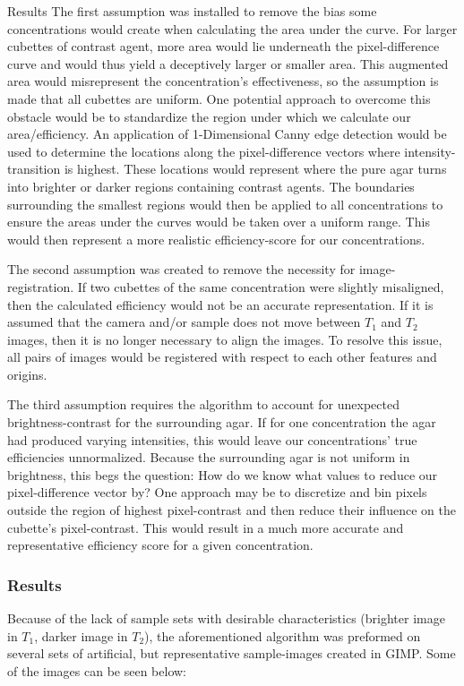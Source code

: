 \documentclass[a4paper,12pt]{article}
\begin{document}
\begin{section}{Results}
The first assumption was installed to remove the bias some concentrations would create when calculating the area under the curve. For larger cubettes of contrast agent, more area would lie underneath the pixel-difference curve and would thus yield a deceptively larger or smaller area. This augmented area would misrepresent the concentration's effectiveness, so the assumption is made that all cubettes are uniform. One potential approach to overcome this obstacle would be to standardize the region under which we calculate our area/efficiency. An application of 1-Dimensional Canny edge detection would be used to determine the locations along the pixel-difference vectors where intensity-transition is highest. These locations would represent where the pure agar turns into brighter or darker regions containing contrast agents. The boundaries surrounding the smallest regions would then be applied to all concentrations to ensure the areas under the curves would be taken over a uniform range. This would then represent a more realistic efficiency-score for our concentrations.

The second assumption was created to remove the necessity for image-registration. If two cubettes of the same concentration were slightly misaligned, then the calculated efficiency would not be an accurate representation. If it is assumed that the camera and/or sample does not move between $T_1$ and $T_2$ images, then it is no longer necessary to align the images. To resolve this issue, all pairs of images would be registered with respect to each other features and origins.

The third assumption requires the algorithm to account for unexpected brightness-contrast for the surrounding agar. If for one concentration the agar had produced varying intensities, this would leave our concentrations' true efficiencies unnormalized. Because the surrounding agar is not uniform in brightness, this begs the question: How do we know what values to reduce our pixel-difference vector by? One approach may be to discretize and bin pixels outside the region of highest pixel-contrast and then reduce their influence on the cubette's pixel-contrast. This would result in a much more accurate and representative efficiency score for a given concentration. 

\subsubsection{Results}

Because of the lack of sample sets with desirable characteristics (brighter image in $T_1$, darker image in $T_2$), the aforementioned algorithm was preformed on several sets of artificial, but representative sample-images created in GIMP. Some of the images can be seen below:


\end{section}
\end{document}
